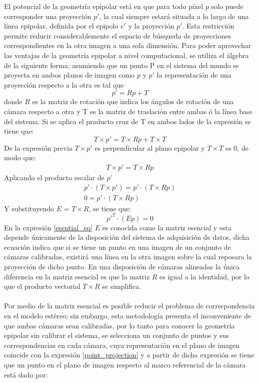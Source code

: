 El potencial de la geometría epipolar está en que para todo píxel $p$ solo puede corresponder una proyección $p'$, la cual siempre estará situada a lo largo de una línea epipolar, definida por el epipolo $e'$ y la proyección $p'$. Esta restricción permite reducir considerablemente el espacio de búsqueda de proyecciones correspondientes en la otra imagen a una sola dimensión. Para poder aprovechar las ventajas de la geometría epipolar a nivel computacional, se utiliza el álgebra de la siguiente forma: asumiendo que un punto P en el sistema del mundo se proyecta en ambos planos de imagen como $p$ y $p'$ la representación de una proyección respecto a la otra es tal que
\begin{equation}
    p' = Rp + T
\end{equation} 
donde $R$ es la matriz de rotación que indica los ángulos de rotación de una cámara respecto a otra y T es la matriz de traslación entre ambas ó la línea base del sistema. Si se aplica el producto cruz de T en ambos lados de la expresión se tiene que:
\begin{equation}
    T \times p' = T \times Rp + T \times T
\end{equation}
De la expresión previa $T \times p'$ es perpendicular al plano epipolar y $T \times T$ es 0, de modo que:
\begin{align}
    T \times p' = T \times Rp
\end{align}
Aplicando el producto escalar de $p'$
\begin{align}
    p'\cdot(T \times p') = p' \cdot(T \times Rp)\\
    0 = p' \cdot(T \times Rp)
\end{align}
Y substituyendo $E$ = $T \times R$, se tiene que:
\begin{equation}
    p'^{T} \cdot(Ep) = 0 \label{esential_eq}
\end{equation}
En la expresión \ref{esential_eq} $E$ es conocida como la matriz esencial y esta depende únicamente de la disposición del sistema de adquisición de datos, dicha ecuación indica que si se tiene un punto en una imagen de un conjunto de cámaras calibradas, existirá una línea en la otra imagen sobre la cual reposara la proyección de dicho punto. En una disposición de cámaras alineadas la única diferencia en la matriz esencial es que la matriz $R$ es igual a la identidad, por lo que el producto vectorial $T \times R$ se simplifica.
\\
\\
Por medio de la matriz esencial es posible reducir el problema de correspondencia en el modelo estéreo; sin embargo, esta metodología presenta el inconveniente de que ambas cámaras sean calibradas, por lo tanto para conocer la geometría epipolar sin calibrar el sistema, se selecciona un conjunto de puntos y sus correspondencias en cada cámara, cuya representación en el plano de imagen coincide con la expresión \ref{point_projection} y a partir de dicha expresión se tiene que un punto en el plano de imagen respecto al marco referencial de la cámara está dado por:
